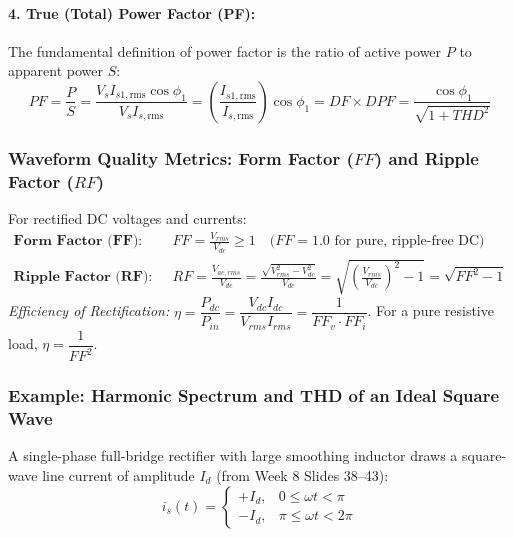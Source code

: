 \paragraph{4. True (Total) Power Factor (PF):}
The fundamental definition of power factor is the ratio of active power $P$ to apparent power $S$:
\begin{equation}
PF = \frac{P}{S} = \frac{V_s I_{s1,\mathrm{rms}} \cos\phi_1}{V_s I_{s,\mathrm{rms}}} = \left(\frac{I_{s1,\mathrm{rms}}}{I_{s,\mathrm{rms}}}\right) \cos\phi_1 = DF \times DPF = \frac{\cos\phi_1}{\sqrt{1 + THD^2}}
\end{equation}
\begin{center}
\end{center}

\subsubsection{Waveform Quality Metrics: Form Factor ($FF$) and Ripple Factor ($RF$)}
For rectified DC voltages and currents:
\begin{align}
\textbf{Form Factor (FF):} \quad & FF = \frac{V_{rms}}{V_{dc}} \ge 1 \quad \text{($FF = 1.0$ for pure, ripple-free DC)} \\
\textbf{Ripple Factor (RF):} \quad & RF = \frac{V_{ac,rms}}{V_{dc}} = \frac{\sqrt{V_{rms}^2 - V_{dc}^2}}{V_{dc}} = \sqrt{\left(\frac{V_{rms}}{V_{dc}}\right)^2 - 1} = \sqrt{FF^2 - 1}
\end{align}
\textit{Efficiency of Rectification:} $\eta = \dfrac{P_{dc}}{P_{in}} = \dfrac{V_{dc} I_{dc}}{V_{rms} I_{rms}} = \dfrac{1}{FF_v \cdot FF_i}$. For a pure resistive load, $\eta = \dfrac{1}{FF^2}$.

\subsubsection{Example: Harmonic Spectrum and THD of an Ideal Square Wave}
A single-phase full-bridge rectifier with large smoothing inductor draws a square-wave line current of amplitude $I_d$ (from Week 8 Slides 38--43):
\begin{equation}
i_s(t) = \begin{cases} +I_d, & 0 \le \omega t < \pi \\ -I_d, & \pi \le \omega t < 2\pi \end{cases}
\end{equation}
